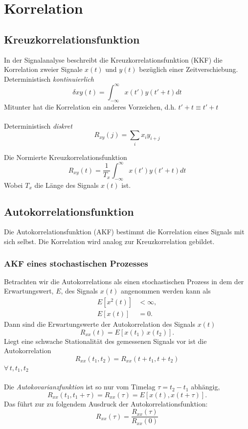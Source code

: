 \chapter{Korrelation}

\section{Kreuzkorrelationsfunktion}

In der Signalanalyse beschreibt die Kreuzkorrelationsfunktion (KKF) die Korrelation zweier Signale $x(t)$ und $y(t)$ bezüglich einer Zeitverschiebung.\\

Deterministisch \textit{kontinuierlich}
\begin{equation}
\delta{xy}(t) = \int_{-\infty}^{\infty} x(t') y(t'+t) dt
\end{equation}
{\small Mitunter hat die Korrelation ein anderes Vorzeichen, d.h. $t'+t \equiv t'+t$}\\\\

Deterministisch \textit{diskret}
\begin{equation}
R_{xy}(j) = \sum_i x_i y_{i+j}
\end{equation}

Die Normierte Kreuzkorrelationsfunktion
\begin{equation}
R_{xy}(t) = \frac{1}{T_x} \int_{-\infty}^{\infty} x(t') y(t'+t) dt
\end{equation}
{\small Wobei $T_x$ die Länge des Signals $x(t)$ ist.}


\section{Autokorrelationsfunktion}
Die Autokorrelationsfunktion (AKF) bestimmt die Korrelation eines Signals mit sich selbst. Die Korrelation wird analog zur Kreuzkorrelation gebildet.

\subsection{AKF eines stochastischen Prozesses}
Betrachten wir die Autokorrelations als einen stochastischen Prozess in dem der Erwartungswert, $E$, des Signals $x(t)$ angenommen werden kann als
\begin{align*}
E[x^2(t)] & < \infty,\\
E[x(t)] & = 0.
\end{align*}
Dann sind die Erwartungswerte der Autokorrelation des Signals $x(t)$
\[
R_{xx}(t) = E[x(t_1)\,x(t_2)].
\]
Liegt eine schwache Stationalität des gemessenen Signals vor ist die Autokorrelation
\[
R_{xx}(t_1, t_2) = R_{xx}(t+t_1, t+t_2)
\]
{\small $\forall\,t, t_1, t_2$}\\\\
Die \textit{Autokovarianzfunktion} ist so nur vom Timelag $\tau = t_2 - t_1$ abhängig,
\[
R_{xx}(t_1, t_1+\tau) = R_{xx}(\tau) = E[x(t), x(t+\tau)].
\]
Das führt zur zu folgendem Ausdruck der Autokorrelationsfunktion:
\begin{equation}
R_{xx}(\tau) = \frac{R_{xx}(\tau)}{R_{xx}(0)}
\end{equation}


